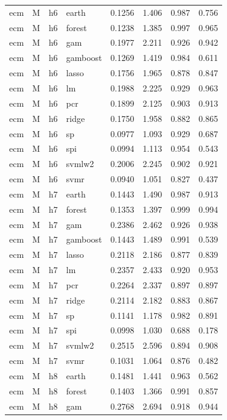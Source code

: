 \begin{ThreePartTable}
\begin{longtable}[t]{llclcccc}
\addlinespace
ecm & M & h6 & earth & 0.1256 & 1.406 & 0.987 & 0.756\\
ecm & M & h6 & forest & 0.1238 & 1.385 & 0.997 & 0.965\\
ecm & M & h6 & gam & 0.1977 & 2.211 & 0.926 & 0.942\\
ecm & M & h6 & gamboost & 0.1269 & 1.419 & 0.984 & 0.611\\
ecm & M & h6 & lasso & 0.1756 & 1.965 & 0.878 & 0.847\\
ecm & M & h6 & lm & 0.1988 & 2.225 & 0.929 & 0.963\\
ecm & M & h6 & pcr & 0.1899 & 2.125 & 0.903 & 0.913\\
ecm & M & h6 & ridge & 0.1750 & 1.958 & 0.882 & 0.865\\
ecm & M & h6 & sp & 0.0977 & 1.093 & 0.929 & 0.687\\
ecm & M & h6 & spi & 0.0994 & 1.113 & 0.954 & 0.543\\
ecm & M & h6 & svmlw2 & 0.2006 & 2.245 & 0.902 & 0.921\\
ecm & M & h6 & svmr & 0.0940 & 1.051 & 0.827 & 0.437\\
\addlinespace
ecm & M & h7 & earth & 0.1443 & 1.490 & 0.987 & 0.913\\
ecm & M & h7 & forest & 0.1353 & 1.397 & 0.999 & 0.994\\
ecm & M & h7 & gam & 0.2386 & 2.462 & 0.926 & 0.938\\
ecm & M & h7 & gamboost & 0.1443 & 1.489 & 0.991 & 0.539\\
ecm & M & h7 & lasso & 0.2118 & 2.186 & 0.877 & 0.839\\
ecm & M & h7 & lm & 0.2357 & 2.433 & 0.920 & 0.953\\
ecm & M & h7 & pcr & 0.2264 & 2.337 & 0.897 & 0.897\\
ecm & M & h7 & ridge & 0.2114 & 2.182 & 0.883 & 0.867\\
ecm & M & h7 & sp & 0.1141 & 1.178 & 0.982 & 0.891\\
ecm & M & h7 & spi & 0.0998 & 1.030 & 0.688 & 0.178\\
ecm & M & h7 & svmlw2 & 0.2515 & 2.596 & 0.894 & 0.908\\
ecm & M & h7 & svmr & 0.1031 & 1.064 & 0.876 & 0.482\\
\addlinespace
ecm & M & h8 & earth & 0.1481 & 1.441 & 0.963 & 0.562\\
ecm & M & h8 & forest & 0.1403 & 1.366 & 0.991 & 0.857\\
ecm & M & h8 & gam & 0.2768 & 2.694 & 0.918 & 0.944\\

\end{longtable}
\end{ThreePartTable}
